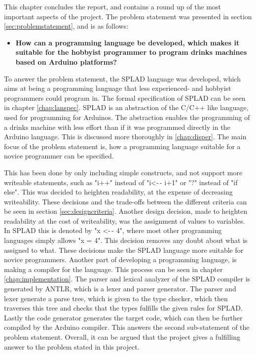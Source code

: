 \label{chap:konklusion}
This chapter concludes the report, and contains a round up of the most important aspects of the project.
The problem statement was presented in section \ref{sec:problemstatement}, and is as follows: 
\begin{itemize}
	\item \textbf{How can a programming language be developed, which makes it suitable for the hobbyist programmer to program drinks machines based on Arduino platforms?}
\end{itemize}

To answer the problem statement, the SPLAD language was developed, which aims at being a programming language that less experienced- and hobbyist programmers could program in. The formal specification of SPLAD can be seen in chapter \ref{chap:lanspec}. SPLAD is an abstraction of the C/C++ like language, used for programming for Arduinos. The abstraction enables the programming of a drinks machine with less effort than if it was programmed directly in the Arduino language. This is discussed more thoroughly in \ref{chap:disper}. The main focus of the problem statement is, how a programming language suitable for a novice programmer can be specified.

This has been done by only including simple constructs, and not support more writeable statements, such as "i++" instead of "i<-$\,$- i+1" or "?" instead of "if else". This was decided to heighten readability, at the expense of decreasing writeability. These decisions and the trade-offs between the different criteria can be seen in section \ref{sec:designcriteria}. Another design decision, made to heighten readability at the cost of writeability, was the assignment of values to variables. In SPLAD this is denoted by "x <-$\,$- 4", where most other programming languages simply allows "x = 4". This decision removes any doubt about what is assigned to what. These decisions make the SPLAD language more suitable for novice programmers.
Another part of developing a programming language, is making a compiler for the language. This process can be seen in chapter \ref{chap:implementation}. The parser and lexical analyzer of the SPLAD compiler is generated by ANTLR, which is a lexer and parser generator. The parser and lexer generate a parse tree, which is given to the type checker, which then traverses this tree and checks that the types fulfills the given rules for SPLAD. Lastly the code generator generates the target code, which can then be further compiled by the Arduino compiler. This answers the second sub-statement of the problem statement. Overall, it can be argued that the project gives a fulfilling answer to the problem stated in this project. 